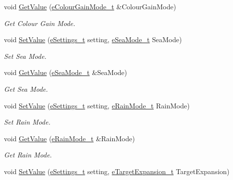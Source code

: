 \begin{DoxyCompactItemize}
void \mbox{\hyperlink{struct_quantum_lib_1_1_setting_data__t_a97a54e9aa97b5a2895d61446716b7fd6}{Get\+Value}} (\mbox{\hyperlink{namespace_quantum_lib_a4e404872667f9386ba59973f4b29fe65}{e\+Colour\+Gain\+Mode\+\_\+t}} \&Colour\+Gain\+Mode)
\begin{DoxyCompactList}\small\item\em Get Colour Gain Mode. \end{DoxyCompactList}\item 
void \mbox{\hyperlink{struct_quantum_lib_1_1_setting_data__t_a8c95fd319a3a2c4b1384f7ee59aaf148}{Set\+Value}} (\mbox{\hyperlink{namespace_quantum_lib_acc8124e3e65bca4aa798d03a55e3d54c}{e\+Settings\+\_\+t}} setting, \mbox{\hyperlink{namespace_quantum_lib_a66c359df4d1d3895303ab24910200c8d}{e\+Sea\+Mode\+\_\+t}} Sea\+Mode)
\begin{DoxyCompactList}\small\item\em Set Sea Mode. \end{DoxyCompactList}\item 
void \mbox{\hyperlink{struct_quantum_lib_1_1_setting_data__t_a77418c42e6e6577e19141a8f733b972b}{Get\+Value}} (\mbox{\hyperlink{namespace_quantum_lib_a66c359df4d1d3895303ab24910200c8d}{e\+Sea\+Mode\+\_\+t}} \&Sea\+Mode)
\begin{DoxyCompactList}\small\item\em Get Sea Mode. \end{DoxyCompactList}\item 
void \mbox{\hyperlink{struct_quantum_lib_1_1_setting_data__t_a942e5af26494a7865586b9b67b5941bb}{Set\+Value}} (\mbox{\hyperlink{namespace_quantum_lib_acc8124e3e65bca4aa798d03a55e3d54c}{e\+Settings\+\_\+t}} setting, \mbox{\hyperlink{namespace_quantum_lib_a881f6940f59e1d22cecd947de841b245}{e\+Rain\+Mode\+\_\+t}} Rain\+Mode)
\begin{DoxyCompactList}\small\item\em Set Rain Mode. \end{DoxyCompactList}\item 
void \mbox{\hyperlink{struct_quantum_lib_1_1_setting_data__t_a4587b34d219d7a28d0e19511b6205d01}{Get\+Value}} (\mbox{\hyperlink{namespace_quantum_lib_a881f6940f59e1d22cecd947de841b245}{e\+Rain\+Mode\+\_\+t}} \&Rain\+Mode)
\begin{DoxyCompactList}\small\item\em Get Rain Mode. \end{DoxyCompactList}\item 
void \mbox{\hyperlink{struct_quantum_lib_1_1_setting_data__t_abad3d6c91619a27765fa8d1dad3ee352}{Set\+Value}} (\mbox{\hyperlink{namespace_quantum_lib_acc8124e3e65bca4aa798d03a55e3d54c}{e\+Settings\+\_\+t}} setting, \mbox{\hyperlink{namespace_quantum_lib_affbc8bc0775b14917688e0e6d2fab0fb}{e\+Target\+Expansion\+\_\+t}} Target\+Expansion)

\end{DoxyCompactItemize}
